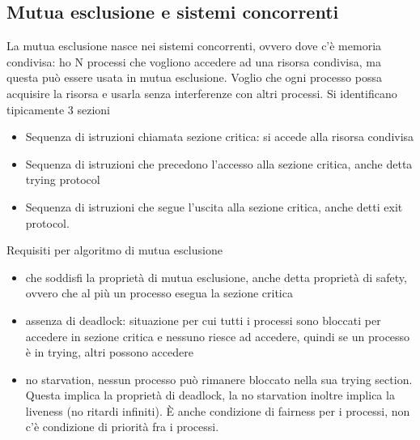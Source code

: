 \documentclass[16px]{article}
\begin{document}
\subsection{Mutua esclusione e sistemi concorrenti}
La mutua esclusione nasce nei sistemi concorrenti, ovvero dove c'è memoria condivisa: ho N processi che vogliono accedere ad una risorsa condivisa, ma questa può essere usata in mutua esclusione. Voglio che ogni processo possa acquisire la risorsa e usarla senza interferenze con altri processi. Si identificano tipicamente 3 sezioni
\begin{itemize}
\item Sequenza di istruzioni chiamata sezione critica: si accede alla risorsa condivisa
\item Sequenza di istruzioni che precedono l'accesso alla sezione critica, anche detta trying protocol
\item Sequenza di istruzioni che segue l'uscita alla sezione critica, anche detti exit protocol.
\end{itemize}
Requisiti per algoritmo di mutua esclusione 
\begin{itemize}
\item che soddisfi la proprietà di mutua esclusione, anche detta proprietà di safety, ovvero che al più un processo esegua la sezione critica
\item assenza di deadlock: situazione per cui tutti i processi sono bloccati per accedere in sezione critica e nessuno riesce ad accedere, quindi se un processo è in trying, altri possono accedere
\item no starvation, nessun processo può rimanere bloccato nella sua trying section. Questa implica la proprietà di deadlock, la no starvation inoltre implica la liveness (no ritardi infiniti). È anche condizione di fairness per i processi, non c'è condizione di priorità fra i processi.
\end{itemize}
\end{document}
